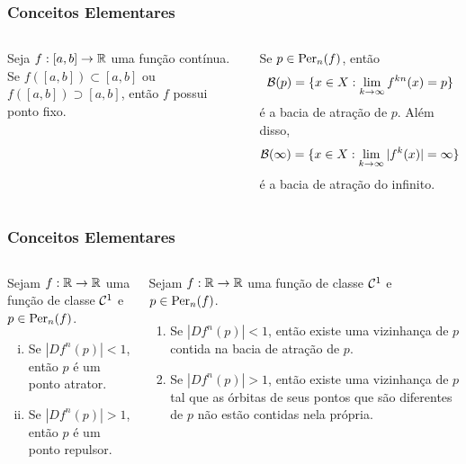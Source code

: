 
\begin{frame} 
\vspace{5pt}
\frametitle{Conceitos Elementares}
\begin{columns}
\column{\dimexpr\paperwidth-15pt}

\begin{proposition}
Seja $f: [a, b] \to \mathbb{R}$ uma função contínua. Se $f([a, b]) \subset [a, b]$ ou $f([a, b]) \supset [a, b]$, então $f$ possui ponto fixo.
\end{proposition}

\vspace{10pt}

\begin{definition} 
Se $p \in \operatorname{Per}_n(f)$, então
$$\mathcal{B}(p) = \lbrace x \in  X: \lim_{k \to \infty} f^{kn}(x) = p \rbrace$$
é a bacia de atração de $p$. Além disso,
$$\mathcal{B}(\infty) = \lbrace x \in  X: \lim_{k \to \infty} |f^k(x)| = \infty \rbrace$$
é a bacia de atração do infinito.
\end{definition}

\end{columns}
\end{frame}


\begin{frame}
\vspace{5pt}
\frametitle{Conceitos Elementares}
\begin{columns}
\column{\dimexpr\paperwidth-15pt}

\begin{definition}
Sejam $f: \mathbb{R} \to \mathbb{R}$ uma função de classe $\mathcal{C}^1$ e $p \in \operatorname{Per}_n(f)$.
\begin{enumerate}[i.]
\item Se $|D f^n(p)| < 1$, então $p$ é um ponto atrator.
\item Se $|D f^n(p)| > 1$, então $p$ é um ponto repulsor.
\end{enumerate}
\end{definition}

\vspace{10pt}

\begin{theorem}
Sejam $f: \mathbb{R} \to \mathbb{R}$ uma função de classe $\mathcal{C}^1$ e $p \in \operatorname{Per}_n(f)$.
\begin{enumerate}
\item Se $|D f^n(p)| < 1$, então existe uma vizinhança de $p$ contida na bacia de atração de $p$.
\item Se $|D f^n(p)| > 1$, então existe uma vizinhança de $p$ tal que as órbitas de seus pontos que são diferentes de $p$ não estão contidas nela própria.
\end{enumerate}
\end{theorem}

\end{columns}
\end{frame}

